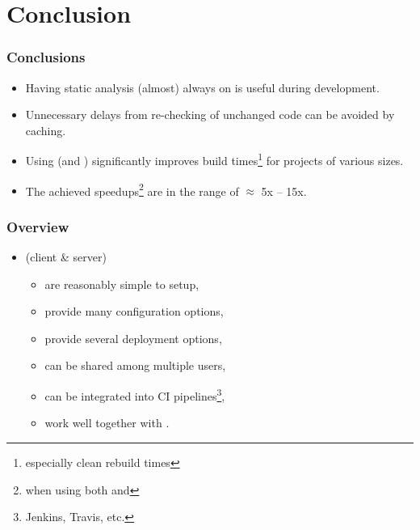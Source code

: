 \documentclass[compress,table,xcolor=table]{beamer}
\begin{document}
\section{Conclusion}
\begin{frame}
  \Huge
\end{frame}
\begin{frame}
  \frametitle{Conclusions}
    \Large
    \begin{itemize}
    \item Having static analysis (almost) always on is useful during development.
    \item Unnecessary delays from re-checking of unchanged code can be avoided
        by caching.
    \item Using  (and )
        significantly improves build times\footnote{especially clean rebuild
            times} for projects of various sizes.
    \item The achieved speedups\footnote{when using both 
        and } are in the range of $\approx$ 5x -- 15x.
    \end{itemize}
\end{frame}
\begin{frame}
  \frametitle{Overview}
    \LARGE
    \begin{itemize}
    \item {} (client \& server)
    \begin{itemize}
    \item are reasonably simple to setup,
    \item provide many configuration options,
    \item provide several deployment options,
    \item can be shared among multiple users,
    \item can be integrated into CI pipelines\footnote{Jenkins, Travis, etc.},
    \item work well together with .
    \end{itemize}
    \end{itemize}
\end{frame}
\end{document}

